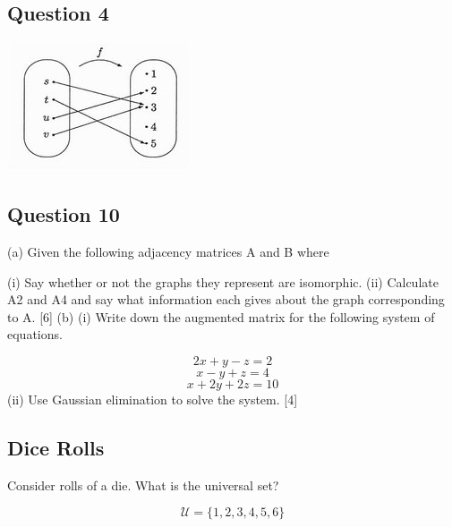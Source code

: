 \documentclass[]{report}
\begin{document}

\subsection*{Question 4}
\begin{center}
\includegraphics[scale=0.55]{HibCollArrow.jpg}
\end{center}




\subsection*{Question 10}

(a) Given the following adjacency matrices A and B where
%
%
%



(i) Say whether or not the graphs they represent are isomorphic.
(ii) Calculate A2 and A4 and say what information each gives about the graph
corresponding to A. [6]
(b) (i) Write down the augmented matrix for the following system of equations.

\[2x + y - z = 2\]
\[x - y + z = 4\]
\[x + 2y + 2z = 10\]
(ii) Use Gaussian elimination to solve the system. [4]



\subsection*{Dice Rolls}
Consider rolls of a die. What is the universal set?

\[ \mathcal{U} = \{1,2,3,4,5,6\} \]

\end{document}
